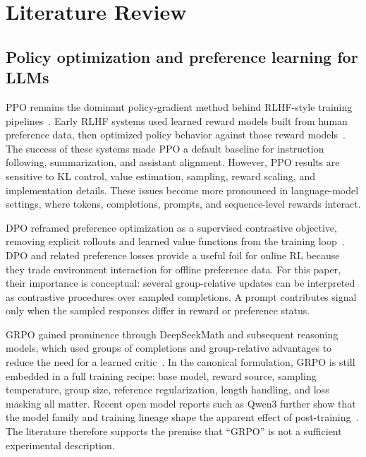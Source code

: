 \documentclass[runningheads,a4paper]{llncs}
\begin{document}
\section{Literature Review}
\label{sec:literature}

\subsection{Policy optimization and preference learning for LLMs}

PPO remains the dominant policy-gradient method behind RLHF-style training
pipelines~\cite{schulman2017proximal,ouyang2022training}. Early RLHF systems
used learned reward models built from human preference data, then optimized
policy behavior against those reward models~\cite{christiano2017deeprlhf,stiennon2020summarize,bai2022hhrlhf}. The success of these systems made PPO a
default baseline for instruction following, summarization, and assistant
alignment. However, PPO results are sensitive to KL control, value estimation,
sampling, reward scaling, and implementation details. These issues become more
pronounced in language-model settings, where tokens, completions, prompts, and
sequence-level rewards interact.

DPO reframed preference optimization as a supervised contrastive objective,
removing explicit rollouts and learned value functions from the training
loop~\cite{rafailov2024direct}. DPO and related preference losses provide a
useful foil for online RL because they trade environment interaction for
offline preference data. For this paper, their importance is conceptual:
several group-relative updates can be interpreted as contrastive procedures
over sampled completions. A prompt contributes signal only when the sampled
responses differ in reward or preference status.

GRPO gained prominence through DeepSeekMath and subsequent reasoning models,
which used groups of completions and group-relative advantages to reduce the
need for a learned critic~\cite{shao2024deepseekmath,guo2025deepseekr1}. In
the canonical formulation, GRPO is still embedded in a full training recipe:
base model, reward source, sampling temperature, group size, reference
regularization, length handling, and loss masking all matter. Recent open
model reports such as Qwen3 further show that the model family and training
lineage shape the apparent effect of post-training~\cite{qwen2025qwen3}. The
literature therefore supports the premise that ``GRPO'' is not a sufficient
experimental description.
\end{document}
